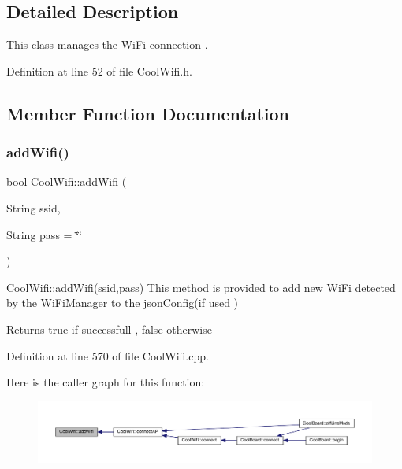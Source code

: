 \subsection{Detailed Description}
This class manages the Wi\+Fi connection . 

Definition at line 52 of file Cool\+Wifi.\+h.



\subsection{Member Function Documentation}
\mbox{\label{class_cool_wifi_a914d7a1df14dd6b75345fb614c34e9d6}} 
\subsubsection{\texorpdfstring{add\+Wifi()}{addWifi()}}
{\footnotesize\ttfamily bool Cool\+Wifi\+::add\+Wifi (\begin{DoxyParamCaption}\item[{String}]{ssid,  }\item[{String}]{pass = {\ttfamily \char`\"{}\char`\"{}} }\end{DoxyParamCaption})}

Cool\+Wifi\+::add\+Wifi(ssid,pass) This method is provided to add new Wi\+Fi detected by the \hyperlink{class_wi_fi_manager}{Wi\+Fi\+Manager} to the json\+Config(if used )

\begin{DoxyReturn}{Returns}
true if successfull , false otherwise 
\end{DoxyReturn}


Definition at line 570 of file Cool\+Wifi.\+cpp.

Here is the caller graph for this function\+:
\nopagebreak
\begin{figure}[H]
\begin{center}
\leavevmode
\includegraphics[width=350pt]{class_cool_wifi_a914d7a1df14dd6b75345fb614c34e9d6_icgraph}
\end{center}
\end{figure}
\mbox{\label{class_cool_wifi_a46942fed90e475112cc10b78a32e7aaa}} 
